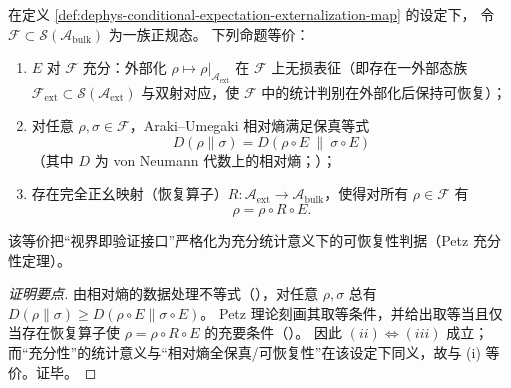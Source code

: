 \begin{theorem}\label{thm:dephys-petz-sufficiency-equivalences}
在定义 \ref{def:dephys-conditional-expectation-externalization-map} 的设定下，
令 \(\mathcal{F}\subset\mathcal{S}(\mathcal{A}_{\mathrm{bulk}})\) 为一族正规态。
下列命题等价：
\begin{enumerate}
  \item[(i)] \(E\) 对 \(\mathcal{F}\) 充分：外部化 \(\rho\mapsto \rho|_{\mathcal{A}_{\mathrm{ext}}}\) 在 \(\mathcal{F}\) 上无损表征（即存在一外部态族 \(\mathcal{F}_{\mathrm{ext}}\subset\mathcal{S}(\mathcal{A}_{\mathrm{ext}})\) 与双射对应，使 \(\mathcal{F}\) 中的统计判别在外部化后保持可恢复）；
  \item[(ii)] 对任意 \(\rho,\sigma\in\mathcal{F}\)，Araki--Umegaki 相对熵满足保真等式
  \begin{equation}\label{eq:dephys-relative-entropy-sufficiency-equality}
  \boxed{\;
  D(\rho\|\sigma)=D(\rho\circ E\ \|\ \sigma\circ E)\;}
  \end{equation}
  （其中 \(D\) 为 von Neumann 代数上的相对熵；\cite{Araki1976RelativeEntropyVonNeumann}）；
  \item[(iii)] 存在完全正幺映射（恢复算子）\(R:\mathcal{A}_{\mathrm{ext}}\to\mathcal{A}_{\mathrm{bulk}}\)，使得对所有 \(\rho\in\mathcal{F}\) 有
  \begin{equation}\label{eq:dephys-recovery-map-identity-on-family}
  \boxed{\;
  \rho=\rho\circ R\circ E.\;}
  \end{equation}
\end{enumerate}
该等价把“视界即验证接口”严格化为充分统计意义下的可恢复性判据（Petz 充分性定理）。
\end{theorem}

\begin{proof}[证明要点]
由相对熵的数据处理不等式（\cite{Petz2003MonotonicityRelativeEntropyRevisited}），对任意 \(\rho,\sigma\) 总有
\(
D(\rho\|\sigma)\ge D(\rho\circ E\|\sigma\circ E)
\)。
Petz 理论刻画其取等条件，并给出取等当且仅当存在恢复算子使 \(\rho=\rho\circ R\circ E\) 的充要条件（\cite{Petz1986SufficientSubalgebrasRelativeEntropy}）。
因此 \((ii)\Longleftrightarrow(iii)\) 成立；而“充分性”的统计意义与“相对熵全保真/可恢复性”在该设定下同义，故与 (i) 等价。证毕。
\end{proof}

